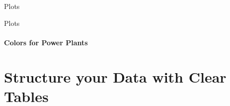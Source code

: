 \documentclass[aspectratio=169]{beamer}
\begin{document}
\begin{frame}{Plots}
\end{frame}


\begin{frame}{Plots}
    \framesubtitle{Colors for Power Plants}

    \begin{table}[htbp]
        \scalebox{0.94}{
            
        }
    \end{table}

\end{frame}


\section{\textbf{Structure} your \textbf{Data} with Clear \textbf{Tables}}

\begin{frame}
    \agenda     
\end{frame}
\end{document}
